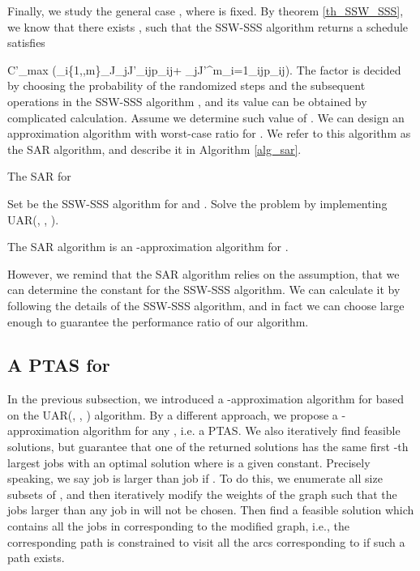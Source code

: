 \documentclass{llncs}
\newcommand{\be}{}
\numberwithin{subcase}{case}
\begin{document}
Finally, we study the general case , where  is fixed. By theorem \ref{th_SSW_SSS}, we know that there exists , such that the SSW-SSS algorithm returns a schedule satisfies
\be
C'_{max} \leq\alpha{}\left(\max_{i\in\{1,\cdots,m\}}{\sum_{J_j\in J'}\mu_{ij}p_{ij}}+ \max_{j\in J'}{\sum^{m}_{i=1}\mu_{ij}p_{ij}}\right).\label{eq:sjar_1}
\ee
The factor  is decided by choosing the probability of the randomized steps and the subsequent operations in the SSW-SSS algorithm \cite{Shmoys1994,Schmidt1995}, and its value can be obtained by complicated calculation. Assume we determine such value of . We can design an approximation algorithm with worst-case ratio  for . We refer to this algorithm as the SAR algorithm, and describe it in Algorithm \ref{alg_sar}.

\begin{algorithm}[htb]
\caption{The SAR for }
\label{alg_sar}
\begin{algorithmic}[1]
\STATE Set  be the SSW-SSS algorithm for  and .
\STATE Solve the problem by implementing UAR(, , ).
\end{algorithmic}
\end{algorithm}

\begin{theorem}
The SAR algorithm is an -approximation algorithm for .  \label{th_SAR}
\end{theorem}

However, we remind that the SAR algorithm relies on the assumption, that we can determine the constant  for the SSW-SSS algorithm. We can calculate it by following the details of the SSW-SSS algorithm, and in fact we can choose  large enough to guarantee the performance ratio of our algorithm.

\subsection{A PTAS for }\label{sec_alg_1+e_o}
In the previous subsection, we introduced a -approximation algorithm for  based on the UAR(, , ) algorithm. By a different approach, we propose a -approximation algorithm for any , i.e. a PTAS. We also iteratively find feasible solutions, but guarantee that one of the returned solutions has the same first -th largest jobs with an optimal solution where  is a given constant. Precisely speaking, we say job  is larger than job  if . To do this, we enumerate all size  subsets  of , and then iteratively modify the weights of the graph such that the jobs larger than any job in  will not be chosen. Then find a feasible solution which contains all the jobs in  corresponding to the modified graph, i.e., the corresponding path is constrained to visit all the arcs corresponding to  if such a path exists.
\end{document}
